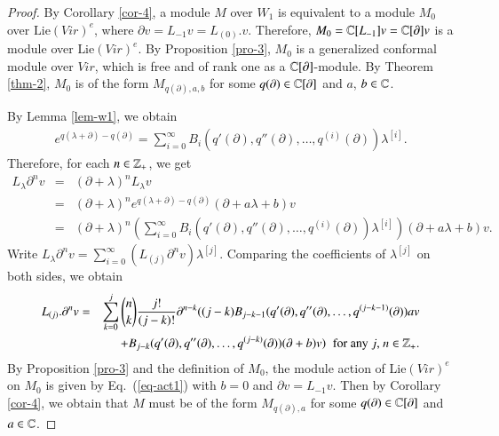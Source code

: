 \documentclass[12pt]{amsart}
\begin{document}
\begin{proof}
By Corollary \ref{cor-4}, a module $M$ over $W_1$ is equivalent to a module $M_0$ over $\text{Lie}(Vir)^e$, where $\partial v=L_{-1}v=L_{(0)}.v$. Therefore,  $M_0=\mathbb{C}[L_{-1}]v=\mathbb{C}[\partial]v$ is a module over $\text{Lie}(Vir)^e$. By Proposition \ref{pro-3}, $M_0$ is a generalized conformal module over $Vir$, which is free and of rank one as a $\mathbb{C}[\partial]$-module. By Theorem \ref{thm-2},  $M_0$ is of the form $M_{q(\partial), a, b}$ for some $q(\partial)\in \mathbb{C}[\partial]$ and $a$, $b\in \mathbb{C}$.

By Lemma \ref{lem-w1}, we obtain
\begin{eqnarray*}
e^{q(\lambda+\partial)-q(\partial)}=\sum_{i=0}^\infty B_i(q'(\partial), q''(\partial), \ldots, q^{(i)}(\partial))\lambda^{[i]}.
\end{eqnarray*}
Therefore, for each $n\in \mathbb{Z}_+$, we get
\begin{eqnarray*}
L_\lambda \partial^nv&=&(\partial+\lambda)^nL_\lambda v\\
&=&(\partial+\lambda)^ne^{q(\lambda+\partial)-q(\partial)}(\partial+a\lambda+b)v\\
&=&(\partial+\lambda)^n(\sum_{i=0}^\infty B_i(q'(\partial), q''(\partial), \ldots, q^{(i)}(\partial))\lambda^{[i]})(\partial+a\lambda+b)v.
\end{eqnarray*}
Write $L_\lambda \partial^nv=\sum_{i=0}^\infty (L_{(j)}\partial^nv)\lambda^{[j]}$. Comparing the coefficients of $\lambda^{[j]}$ on both sides, we obtain
\begin{eqnarray}
L_{(j)}. \partial^nv&=&\sum_{k=0}^j\binom{n}{k}\frac{j!}{(j-k)!}\partial^{n-k}((j-k)B_{j-k-1}(q'(\partial), q''(\partial),\ldots, q^{(j-k-1)}(\partial))av\nonumber\\
&&\quad +B_{j-k}(q'(\partial), q''(\partial),\ldots, q^{(j-k)}(\partial))(\partial+b)v)\;\; \text{for any $j$, $n\in \mathbb{Z}_{+}$.}\label{eq-act1}
\end{eqnarray}
By Proposition \ref{pro-3} and the definition of $M_0$, the module action of $\text{Lie}(Vir)^e$ on $M_0$ is given by
Eq.~(\ref{eq-act1}) with $b=0$ and $\partial v=L_{-1}v$. Then by Corollary \ref{cor-4}, we obtain that $M$ must be of the form $M_{q(\partial), a}$ for some $q(\partial)\in \mathbb{C}[\partial]$ and $a\in \mathbb{C}$.
\end{proof}
\end{document}
